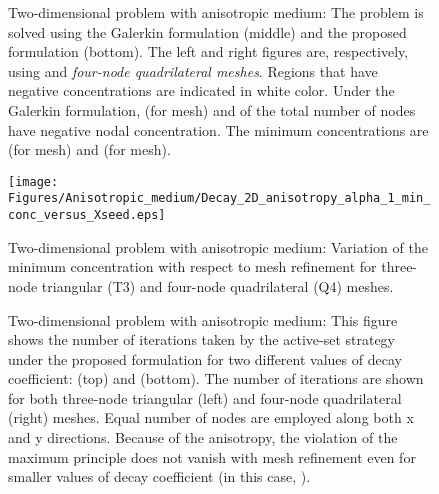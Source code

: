 \documentclass[11pt]{amsart}
\begin{document}
\begin{figure}
  \centering
\caption{Two-dimensional problem with anisotropic medium: The problem is solved using 
      the Galerkin formulation (middle) and the proposed formulation (bottom). The left and right 
      figures are, respectively, using  and  \emph{four-node 
      quadrilateral meshes}. Regions that have negative concentrations are indicated in white 
      color. Under the Galerkin formulation,  (for  mesh) and  
      of the total number of nodes have negative nodal concentration. The minimum concentrations 
      are  (for  mesh) and  (for  mesh).}
    \label{Fig:Decay_2D_anisotropic_Q4}
\end{figure}

\begin{figure}[!h]
  \centering
  \texttt{[image: Figures/Anisotropic\_medium/Decay\_2D\_anisotropy\_alpha\_1\_min\_conc\_versus\_Xseed.eps]}
\caption{Two-dimensional problem with anisotropic medium: Variation of the minimum 
    concentration with respect to mesh refinement for three-node triangular (T3) and 
    four-node quadrilateral (Q4) meshes.} \label{Fig:Decay_2D_anisotropic_min_conc_mesh_refinement}
\end{figure}

\begin{figure}[htbp]
  \centering
\caption{Two-dimensional problem with anisotropic medium: This figure shows the number of iterations 
    taken by the active-set strategy under the proposed formulation for two different values of decay 
    coefficient:  (top) and  (bottom). The number of iterations are shown for 
    both three-node triangular (left) and four-node quadrilateral (right) meshes. Equal number of nodes 
    are employed along both x and y directions. Because of the anisotropy, the violation of the maximum 
    principle does not vanish with mesh refinement even for smaller values of decay coefficient (in 
    this case, ).} \label{Fig:Decay_anisotropy_iterations_vs_XSeed_alpha_1}
\end{figure}
\end{document}
